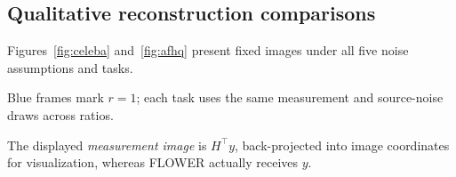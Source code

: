 \documentclass[11pt,a4paper]{article}
\begin{document}
\begin{table}[htbp]

\centering
\footnotesize

\caption{
Selected paired metric changes.
}

\label{tab:selected}


\end{table}



\subsection{Qualitative reconstruction comparisons}

Figures~\ref{fig:celeba} and~\ref{fig:afhq} present fixed images
under all five noise assumptions and tasks.

Blue frames mark $r=1$; each task uses the same measurement
and source-noise draws across ratios.

The displayed \emph{measurement image} is $H^\top y$,
back-projected into image coordinates for visualization,
whereas FLOWER actually receives $y$.
\end{document}
